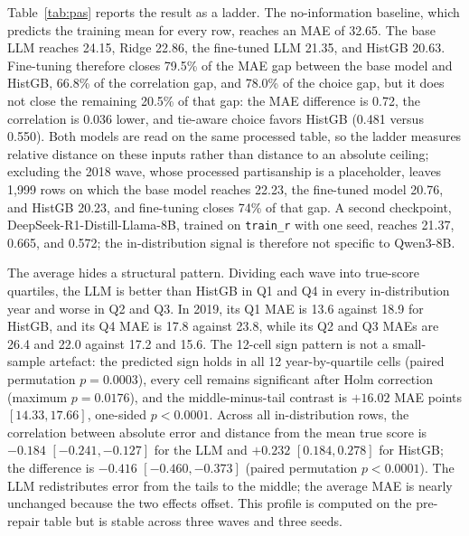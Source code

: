 Table~\ref{tab:pas} reports the result as a ladder. The no-information baseline,
which predicts the training mean for every row, reaches an MAE of 32.65.
The base LLM reaches 24.15, Ridge 22.86, the fine-tuned LLM 21.35, and
HistGB 20.63. Fine-tuning therefore closes 79.5\% of the MAE gap between
the base model and HistGB, 66.8\% of the correlation gap, and 78.0\% of
the choice gap, but it does not close the remaining 20.5\% of that gap:
the MAE difference is 0.72, the correlation is 0.036 lower, and
tie-aware choice favors HistGB (0.481 versus 0.550). Both models are
read on the same processed table, so the ladder measures relative
distance on these inputs rather than distance to an absolute ceiling;
excluding the 2018 wave, whose processed partisanship is a placeholder,
leaves 1,999 rows on which the base model reaches 22.23, the fine-tuned
model 20.76, and HistGB 20.23, and fine-tuning closes 74\% of that gap.
A second checkpoint, DeepSeek-R1-Distill-Llama-8B, trained on
\texttt{train\_r} with one seed, reaches 21.37, 0.665, and 0.572; the
in-distribution signal is therefore not specific to Qwen3-8B.




The average hides a structural pattern. Dividing each wave into
true-score quartiles, the LLM is better than HistGB in Q1 and Q4 in
every in-distribution year and worse in Q2 and Q3. In 2019, its Q1 MAE
is 13.6 against 18.9 for HistGB, and its Q4 MAE is 17.8 against 23.8,
while its Q2 and Q3 MAEs are 26.4 and 22.0 against 17.2 and 15.6. The
12-cell sign pattern is not a small-sample artefact: the predicted sign
holds in all 12 year-by-quartile cells (paired permutation
\(p=0.0003\)), every cell remains significant after Holm correction
(maximum \(p=0.0176\)), and the middle-minus-tail contrast is \(+16.02\)
MAE points \([14.33, 17.66]\), one-sided \(p<0.0001\). Across all
in-distribution rows, the correlation between absolute error and
distance from the mean true score is \(-0.184\) \([-0.241,-0.127]\) for
the LLM and \(+0.232\) \([0.184,0.278]\) for HistGB; the difference is
\(-0.416\) \([-0.460,-0.373]\) (paired permutation \(p<0.0001\)). The
LLM redistributes error from the tails to the middle; the average MAE is
nearly unchanged because the two effects offset. This profile is
computed on the pre-repair table but is stable across three waves and
three seeds.

